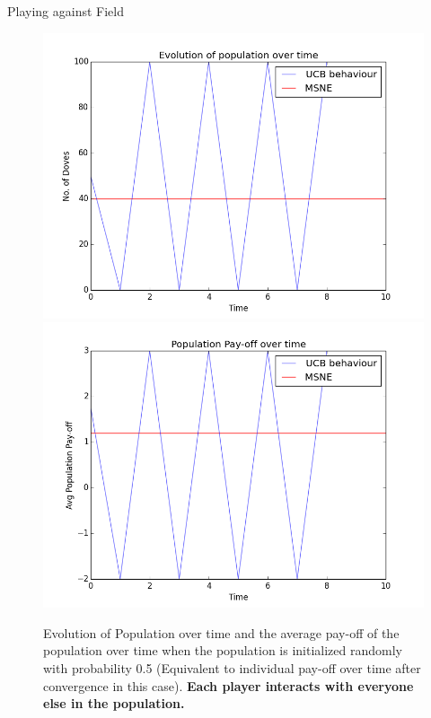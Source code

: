 \documentclass{IFES-beamer}
\begin{document}
        \begin{frame}{Playing against Field}
            \begin{figure}
                \centering
                \includegraphics[scale=0.25]{Images/UCB/Population/full_100_10_epochs.png}
                \includegraphics[scale=0.25]{Images/UCB/Pay-off/pay-off_full_100_10_epochs.png}
                \caption{Evolution of Population over time and the average pay-off of the population over time when the population is initialized randomly with probability 0.5 (Equivalent to individual pay-off over time after convergence in this case). \textbf{Each player interacts with everyone else in the population.}}
                \label{fig:my_label}
            \end{figure}
        \end{frame}
        
\end{document}
